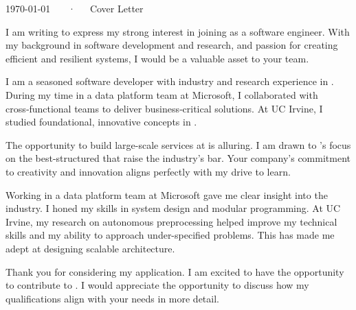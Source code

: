 \documentclass[11pt, a4paper]{awesome-cv}
\begin{document}
\makecvheader[R]

\makecvfooter
  {\today}
  {\myname~~~·~~~Cover Letter}
  {}

\makelettertitle

\begin{cvletter}
I am writing to express my strong interest in joining {\company} as a software engineer. With my background in software development and research, and passion for creating efficient and resilient systems, I would be a valuable asset to your team.

I am a seasoned software developer with industry and research experience in {\myindustryname}. During my time in a data platform team at Microsoft, I collaborated with cross‑functional teams to deliver business‑critical solutions. 
At UC Irvine, I studied foundational, innovative concepts in \myindustryname. 

The opportunity to build large-scale services at {\company} is alluring.
I am drawn to {\company}'s focus on the best-structured {\product} that raise the industry's bar. Your company's commitment to creativity and innovation aligns perfectly with my drive to learn. 
{\aboutcompany} 

Working in a data platform team at Microsoft gave me clear insight into the {\industryname} industry. I honed my skills in system design and modular programming.
At UC Irvine, my research on autonomous preprocessing helped improve my technical skills and my ability to approach under-specified problems. 
This has made me adept at designing scalable architecture. 

\vspace{3mm}
Thank you for considering my application. I am excited to have the opportunity to contribute to \company. I would appreciate the opportunity to discuss how my qualifications align with your needs in more detail. 
\end{cvletter}


\makeletterclosing
\end{document}
